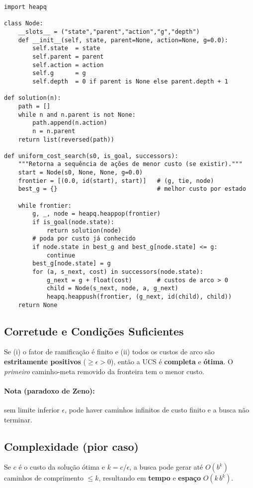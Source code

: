 \documentclass[9pt,a4paper]{extarticle}
\begin{document}
\begin{lstlisting}
import heapq

class Node:
    __slots__ = ("state","parent","action","g","depth")
    def __init__(self, state, parent=None, action=None, g=0.0):
        self.state  = state
        self.parent = parent
        self.action = action
        self.g      = g
        self.depth  = 0 if parent is None else parent.depth + 1

def solution(n):
    path = []
    while n and n.parent is not None:
        path.append(n.action)
        n = n.parent
    return list(reversed(path))

def uniform_cost_search(s0, is_goal, successors):
    """Retorna a sequência de ações de menor custo (se existir)."""
    start = Node(s0, None, None, g=0.0)
    frontier = [(0.0, id(start), start)]   # (g, tie, node)
    best_g = {}                            # melhor custo por estado

    while frontier:
        g, _, node = heapq.heappop(frontier)
        if is_goal(node.state):
            return solution(node)
        # poda por custo já conhecido
        if node.state in best_g and best_g[node.state] <= g:
            continue
        best_g[node.state] = g
        for (a, s_next, cost) in successors(node.state):
            g_next = g + float(cost)       # custos de arco > 0
            child = Node(s_next, node, a, g_next)
            heapq.heappush(frontier, (g_next, id(child), child))
    return None
\end{lstlisting}

\subsection*{Corretude e Condições Suficientes}
Se (i) o fator de ramificação é finito e (ii) todos os custos de arco são \textbf{estritamente positivos} ($\ge \epsilon > 0$), então a UCS é \textbf{completa} e \textbf{ótima}.
O \emph{primeiro} caminho-meta removido da fronteira tem o menor custo.

\paragraph{Nota (paradoxo de Zeno):} sem limite inferior $\epsilon$, pode haver caminhos infinitos de custo finito e a busca não terminar.

\subsection*{Complexidade (pior caso)}
Se $c$ é o custo da solução ótima e $k=c/\epsilon$, a busca pode gerar até $O(b^{k})$ caminhos de comprimento $\le k$, resultando em \textbf{tempo} e \textbf{espaço} $O(k\,b^{k})$.
\end{document}
